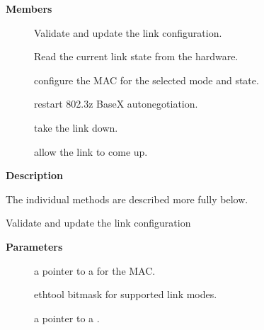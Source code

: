 \documentclass[a4paper,8pt,english]{sphinxmanual}
\begin{document}
\textbf{Members}
\begin{description}
\item[{}] \leavevmode
Validate and update the link configuration.

\item[{}] \leavevmode
Read the current link state from the hardware.

\item[{}] \leavevmode
configure the MAC for the selected mode and state.

\item[{}] \leavevmode
restart 802.3z BaseX autonegotiation.

\item[{}] \leavevmode
take the link down.

\item[{}] \leavevmode
allow the link to come up.

\end{description}

\textbf{Description}

The individual methods are described more fully below.

\begin{fulllineitems}
\label{networking/kapi:c.validate}
Validate and update the link configuration

\end{fulllineitems}


\textbf{Parameters}
\begin{description}
\item[{}] \leavevmode
a pointer to a {\hyperref[networking/kapi:c.net_device]{\emph{}}} for the MAC.

\item[{}] \leavevmode
ethtool bitmask for supported link modes.

\item[{}] \leavevmode
a pointer to a {\hyperref[networking/kapi:c.phylink_link_state]{\emph{}}}.

\end{description}
\end{document}
